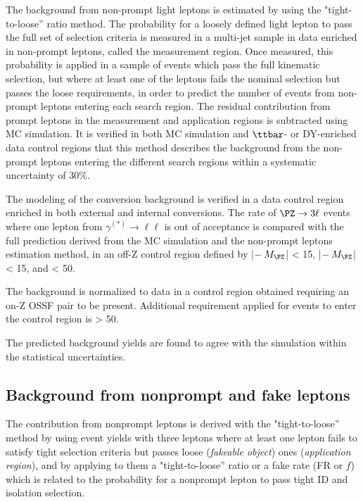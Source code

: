 The background from non-prompt light leptons is estimated by using the "tight-to-loose'' ratio method. 
The probability for a loosely defined light lepton to pass the full set of selection criteria is measured in a multi-jet sample in data enriched in non-prompt leptons, called the measurement region. 
Once measured, this probability is applied in a sample of events which pass the full kinematic selection, but where at least one of the leptons fails the nominal selection but passes the loose requirements, 
in order to predict the number of events from non-prompt leptons entering each search region. 
The residual contribution from prompt leptons in the measurement and application regions is subtracted using MC simulation. 
It is verified in both MC simulation and $\ttbar$- or DY-enriched data control regions that this method describes the background from the non-prompt leptons entering the different search regions within 
a systematic uncertainty of 30\%. 
 
The modeling of the conversion background is verified in a data control region enriched in both external and internal conversions. 
The rate of $\PZ \to 3\ell$ events where one lepton from $\gamma^{(*)}\to\ell\ell$ is out of acceptance is compared with 
the full prediction derived from the MC simulation and the non-prompt leptons estimation method, in an off-Z control region 
defined by |\Mll $- \:M_\PZ$| < 15\GeV, |\mlll $- \:M_\PZ$| < 15\GeV,
and \ptmiss < 50\GeV. 

The \WZ background is normalized to data in a control region obtained 
requiring an on-Z OSSF pair to be present. Additional requirement applied 
for events to enter the control region is \ptmiss > 50\GeV.

The predicted background yields are found to agree with the simulation
within the statistical uncertainties. 


\subsection{Background from nonprompt and fake leptons}

The contribution from nonprompt leptons is derived with the "tight-to-loose'' method
by using event yields with three leptons where at least one lepton fails to satisfy tight
selection criteria but passes loose (\emph{fakeable object}) ones (\emph{application region}), 
and by applying to them  a "tight-to-loose'' ratio or a fake rate (FR or $f$) which is related to the probability for 
a nonprompt lepton to pass tight ID and isolation selection.

